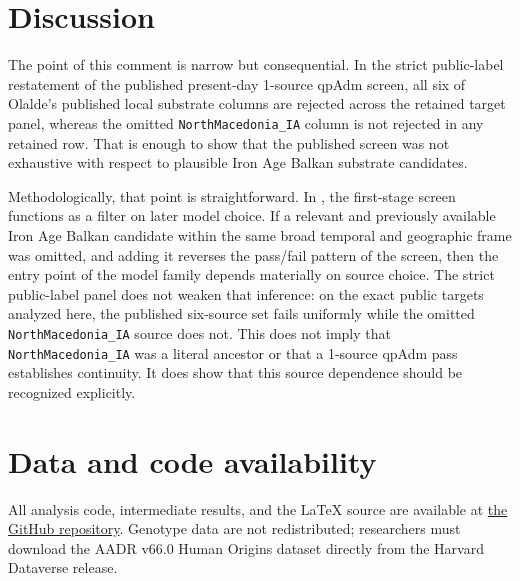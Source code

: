 \documentclass[11pt]{article}
\begin{document}
\section{Discussion}

The point of this comment is narrow but consequential. In the strict
public-label restatement of the published present-day 1-source qpAdm screen,
all six of Olalde's published local substrate columns are rejected across the
retained target panel, whereas the omitted \texttt{NorthMacedonia\_IA} column
is not rejected in any retained row. That is enough to show that the published
screen was not exhaustive with respect to plausible Iron Age Balkan substrate
candidates.

Methodologically, that point is straightforward. In \citet{Olalde2023}, the
first-stage screen functions as a filter on later model choice. If a relevant
and previously available Iron Age Balkan candidate within the same broad
temporal and geographic frame was omitted, and adding it reverses the
pass/fail pattern of the screen, then the entry point of the model family
depends materially on source choice. The strict public-label panel does not
weaken that inference: on the exact public targets analyzed here, the
published six-source set fails uniformly while the omitted
\texttt{NorthMacedonia\_IA} source does not. This does not imply that
\texttt{NorthMacedonia\_IA} was a literal ancestor or that a 1-source qpAdm
pass establishes continuity. It does show that this source dependence should be
recognized explicitly.

\section*{Data and code availability}

All analysis code, intermediate results, and the LaTeX source are available at
\href{https://github.com/nikolatsartsarov/olalde2023_substrate_comment/}{the GitHub repository}.
Genotype data are not redistributed; researchers must download the AADR
v66.0 Human Origins dataset directly from the Harvard Dataverse release.


\end{document}
